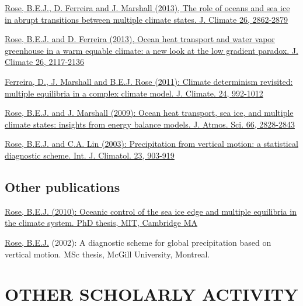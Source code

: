 \documentclass[11pt, letterpaper]{article} %
\newcommand{\years}[1]{\marginnote{\scriptsize #1}} %
\newcommand{\publink}{http://www.atmos.albany.edu/facstaff/brose/resources/Publications/}
\begin{document}
\years{2013}  
\href{\publink Rose_etal_transitions_JClim2013.pdf}{\underline{Rose, B.E.J.}, D. Ferreira and J. Marshall (2013), The role of oceans and sea ice in abrupt transitions between multiple climate states. J. Climate 26, 2862-2879}
\vspace{0.2 cm}

\href{\publink Rose_Ferreira_JClim2013.pdf}{\underline{Rose, B.E.J.} and D. Ferreira (2013), Ocean heat transport and water vapor greenhouse in a warm equable climate: a new look at the low gradient paradox. J. Climate 26, 2117-2136}
\vspace{0.2 cm}

\years{2011}  
\href{\publink FMR_JClim2011_MultipleEq.pdf}{Ferreira, D., J. Marshall and \underline{B.E.J. Rose} (2011): Climate determinism revisited: multiple equilibria in a complex climate model. J. Climate. 24, 992-1012}
\vspace{0.2 cm}
  
\years{2009}  
\href{\publink Rose_Marshall_JAS2009.pdf}{\underline{Rose, B.E.J.} and J. Marshall (2009): Ocean heat transport, sea ice, and multiple climate states: insights from energy balance models. J. Atmos. Sci. 66, 2828-2843}
\vspace{0.2 cm}
  
\years{2003}  
\href{\publink Rose_Lin_2003.pdf}{\underline{Rose, B.E.J.} and C.A. Lin (2003): Precipitation from vertical motion: a statistical diagnostic scheme. Int. J. Climatol. 23, 903-919}


\subsection*{Other publications}
\years{2010}  
\href{\publink Rose_PhD_2010.pdf}{\underline{Rose, B.E.J.} (2010): Oceanic control of the sea ice edge and multiple equilibria in the climate system. PhD thesis, MIT, Cambridge MA}
\vspace{0.2 cm}

\years{2002}  
\underline{Rose, B.E.J.} (2002): A diagnostic scheme for global precipitation based on vertical motion. MSc thesis, McGill University, Montreal.



\section*{OTHER SCHOLARLY ACTIVITY}\label{other-scholarly-activity}
\end{document}
